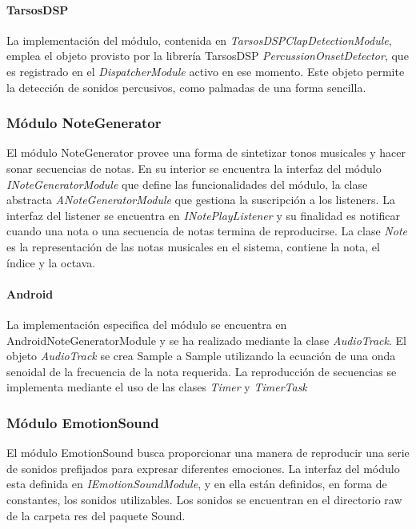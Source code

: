 \paragraph*{TarsosDSP\\} 
La implementación del módulo, contenida en \textit{TarsosDSPClapDetectionModule}, emplea el objeto provisto por la librería TarsosDSP \textit{PercussionOnsetDetector}, que es registrado en el \textit{DispatcherModule} activo en ese momento. Este objeto permite la detección de sonidos percusivos, como palmadas de una forma sencilla.

\subsubsection{Módulo NoteGenerator}
El módulo NoteGenerator provee una forma de sintetizar tonos musicales y hacer sonar secuencias de notas.
En su interior se encuentra la interfaz del módulo \textit{INoteGeneratorModule} que define las funcionalidades del módulo, la clase abstracta \textit{ANoteGeneratorModule} que gestiona la suscripción a los listeners. La interfaz del listener se encuentra en \textit{INotePlayListener} y su finalidad es notificar cuando una nota o una secuencia de notas termina de reproducirse. La clase \textit{Note} es la representación de las notas musicales en el sistema, contiene la nota, el índice y la octava.

\paragraph*{Android\\}

La implementación especifica del módulo se encuentra en AndroidNoteGeneratorModule y se ha realizado mediante la clase \textit{AudioTrack}. El objeto \textit{AudioTrack} se crea Sample a Sample utilizando la ecuación de una onda senoidal de la frecuencia de la nota requerida. La reproducción de secuencias se implementa mediante el uso de las clases \textit{Timer} y \textit{TimerTask}


\subsubsection{Módulo EmotionSound}
El módulo EmotionSound busca proporcionar una manera de reproducir una serie de sonidos prefijados para expresar diferentes emociones.
La interfaz del módulo esta definida en \textit{IEmotionSoundModule}, y en ella están definidos, en forma de constantes, los sonidos utilizables.
Los sonidos se encuentran en el directorio raw de la carpeta res del paquete Sound.
